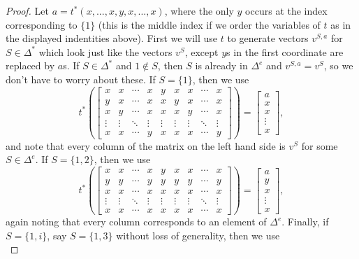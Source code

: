 \begin{proof}
Let $a = t^*(x,...,x,y,x,...,x)$, where the only $y$ occurs at the index corresponding to $\{1\}$ (this is the middle index if we order the variables of $t$ as in the displayed indentities above). First we will use $t$ to generate vectors $v^{S,a}$ for $S \in \Delta^*$ which look just like the vectors $v^S$, except $y$s in the first coordinate are replaced by $a$s. If $S \in \Delta^*$ and $1 \not\in S$, then $S$ is already in $\Delta^e$ and $v^{S,a} = v^S$, so we don't have to worry about these. If $S = \{1\}$, then we use
\[
t^*\left(\begin{bmatrix} x & x & \cdots & x & y & x & x & \cdots & x\\ y & x & \cdots & x & x & y & x & \cdots & x\\ x & y & \cdots & x & x & x & y & \cdots & x\\ \vdots & \vdots & \ddots & \vdots & \vdots & \vdots & \vdots & \ddots & \vdots \\ x & x & \cdots & y & x & x & x & \cdots & y \end{bmatrix}\right) = \begin{bmatrix}a\\ x\\ x\\ \vdots \\ x\end{bmatrix},
\]
and note that every column of the matrix on the left hand side is $v^S$ for some $S \in \Delta^e$. If $S = \{1,2\}$, then we use
\[
t^*\left(\begin{bmatrix} x & x & \cdots & x & y & x & x & \cdots & x\\ y & y & \cdots & y & y & y & y & \cdots & y\\ x & x & \cdots & x & x & x & x & \cdots & x\\ \vdots & \vdots & \ddots & \vdots & \vdots & \vdots & \vdots & \ddots & \vdots \\ x & x & \cdots & x & x & x & x & \cdots & x \end{bmatrix}\right) = \begin{bmatrix}a\\ y\\ x\\ \vdots \\ x\end{bmatrix},
\]
again noting that every column corresponds to an element of $\Delta^e$. Finally, if $S = \{1,i\}$, say $S = \{1,3\}$ without loss of generality, then we use
\[
\]
\end{proof}
